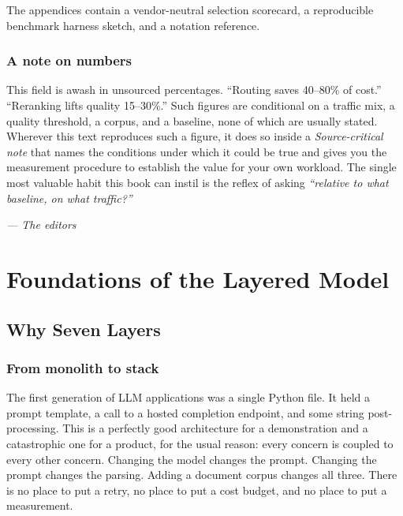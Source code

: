 \documentclass[11pt,twoside,openright]{book}
\theoremstyle{definition}
\theoremstyle{plain}
\theoremstyle{remark}
\begin{document}
The appendices contain a vendor-neutral selection scorecard, a reproducible
benchmark harness sketch, and a notation reference.

\section*{A note on numbers}

This field is awash in unsourced percentages. ``Routing saves 40--80\% of
cost.'' ``Reranking lifts quality 15--30\%.'' Such figures are conditional on a
traffic mix, a quality threshold, a corpus, and a baseline, none of which are
usually stated. Wherever this text reproduces such a figure, it does so inside a
\emph{Source-critical note} that names the conditions under which it could be
true and gives you the measurement procedure to establish the value for your own
workload. The single most valuable habit this book can instil is the reflex of
asking \emph{``relative to what baseline, on what traffic?''}

\vspace{1em}
\noindent\hfill\emph{--- The editors}

\cleardoublepage

\mainmatter
\part{Foundations of the Layered Model}
\label{part:foundations}

\chapter{Why Seven Layers}
\label{ch:layers}

\section{From monolith to stack}

The first generation of LLM applications was a single Python file. It held a
prompt template, a call to a hosted completion endpoint, and some string
post-processing. This is a perfectly good architecture for a demonstration and a
catastrophic one for a product, for the usual reason: every concern is coupled to
every other concern. Changing the model changes the prompt. Changing the prompt
changes the parsing. Adding a document corpus changes all three. There is no
place to put a retry, no place to put a cost budget, and no place to put a
measurement.
\end{document}
